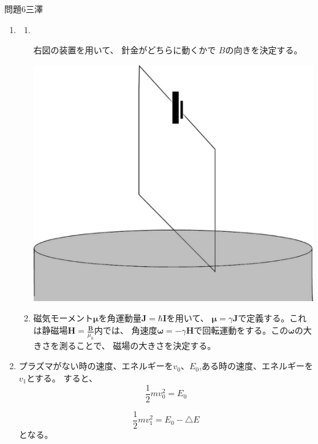 \documentclass[fleqn]{jbook}
\begin{document}
\begin{answer}{問題6}{三澤}
\begin{enumerate}
\begin{equation}
 \begin{split}
  \rho_3&=10.7/3 \\
        &\approx 3.6(m)
 \end{split}
\end{equation}
である。
\item
\begin{enumerate}
\item~
\begin{minipage}{.7\linewidth}
右図の装置を用いて、
針金がどちらに動くかで
$B$の向きを決定する。
\end{minipage}
\begin{minipage}{.3\linewidth}
\includegraphics[width=\linewidth]{2002phy6a.eps}
\end{minipage}
\item
磁気モーメント$\bm{\mu}$を角運動量$\bm{J}=\hbar \bm{I}$を用いて、
$\bm{\mu}=\gamma \bm{J}$で定義する。これは静磁場$\bm{H}=\frac{\bm{B}}{\mu_0}$内では、
角速度$\bm{\omega}=-\gamma \bm{H}$で回転運動をする。この$\bm{\omega}$の大きさを測ることで、
磁場の大きさを決定する。
\end{enumerate}
\item
プラズマがない時の速度、エネルギーを$v_0$、$E_0$,ある時の速度、エネルギーを$v_1$とする。
すると、
\begin{equation}
\frac{1}{2}mv_0^2=E_0   
\end{equation}

\begin{equation}
\frac{1}{2}mv_1^2=E_0-\triangle E  
\end{equation}
となる。


\end{enumerate}
\end{answer}
\end{document}
